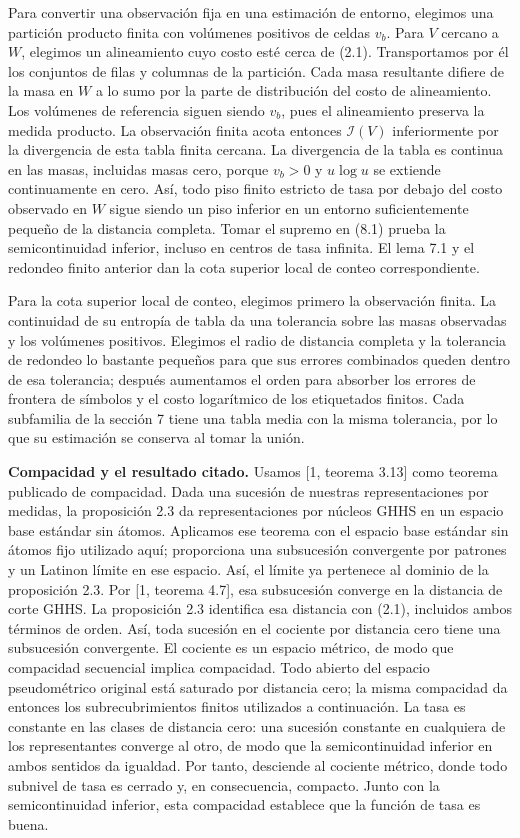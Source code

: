 \documentclass[spanish,11pt,a4paper]{article}
\begin{document}
Para convertir una observación fija en una estimación de entorno, elegimos una partición producto finita con volúmenes positivos de celdas \(v_b\). Para \(V\) cercano a \(W\), elegimos un alineamiento cuyo costo esté cerca de (2.1). Transportamos por él los conjuntos de filas y columnas de la partición. Cada masa resultante difiere de la masa en \(W\) a lo sumo por la parte de distribución del costo de alineamiento. Los volúmenes de referencia siguen siendo \(v_b\), pues el alineamiento preserva la medida producto. La observación finita acota entonces \(\mathcal I(V)\) inferiormente por la divergencia de esta tabla finita cercana. La divergencia de la tabla es continua en las masas, incluidas masas cero, porque \(v_b>0\) y \(u\log u\) se extiende continuamente en cero. Así, todo piso finito estricto de tasa por debajo del costo observado en \(W\) sigue siendo un piso inferior en un entorno suficientemente pequeño de la distancia completa. Tomar el supremo en (8.1) prueba la semicontinuidad inferior, incluso en centros de tasa infinita. El lema 7.1 y el redondeo finito anterior dan la cota superior local de conteo correspondiente.

Para la cota superior local de conteo, elegimos primero la observación finita. La continuidad de su entropía de tabla da una tolerancia sobre las masas observadas y los volúmenes positivos. Elegimos el radio de distancia completa y la tolerancia de redondeo lo bastante pequeños para que sus errores combinados queden dentro de esa tolerancia; después aumentamos el orden para absorber los errores de frontera de símbolos y el costo logarítmico de los etiquetados finitos. Cada subfamilia de la sección 7 tiene una tabla media con la misma tolerancia, por lo que su estimación se conserva al tomar la unión.

\textbf{Compacidad y el resultado citado.} Usamos {[}1, teorema 3.13{]} como teorema publicado de compacidad. Dada una sucesión de nuestras representaciones por medidas, la proposición 2.3 da representaciones por núcleos GHHS en un espacio base estándar sin átomos. Aplicamos ese teorema con el espacio base estándar sin átomos fijo utilizado aquí; proporciona una subsucesión convergente por patrones y un Latinon límite en ese espacio. Así, el límite ya pertenece al dominio de la proposición 2.3. Por {[}1, teorema 4.7{]}, esa subsucesión converge en la distancia de corte GHHS. La proposición 2.3 identifica esa distancia con (2.1), incluidos ambos términos de orden. Así, toda sucesión en el cociente por distancia cero tiene una subsucesión convergente. El cociente es un espacio métrico, de modo que compacidad secuencial implica compacidad. Todo abierto del espacio pseudométrico original está saturado por distancia cero; la misma compacidad da entonces los subrecubrimientos finitos utilizados a continuación. La tasa es constante en las clases de distancia cero: una sucesión constante en cualquiera de los representantes converge al otro, de modo que la semicontinuidad inferior en ambos sentidos da igualdad. Por tanto, desciende al cociente métrico, donde todo subnivel de tasa es cerrado y, en consecuencia, compacto. Junto con la semicontinuidad inferior, esta compacidad establece que la función de tasa es buena.
\end{document}
